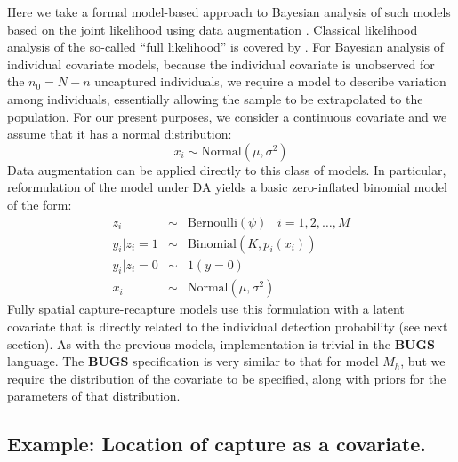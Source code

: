 Here we take a formal model-based approach to Bayesian analysis of
such models based on the joint likelihood using data augmentation
\citep{royle:2009}. Classical likelihood analysis of the so-called
``full likelihood'' is covered by \citet{borchers_etal:2002}.  For
Bayesian analysis of individual covariate models, because the
individual covariate is unobserved for the $n_{0} = N-n$ uncaptured
individuals, we require a model to describe variation among
individuals, essentially allowing the sample to be extrapolated to the
population.  For our present purposes, we consider a continuous
covariate and we assume that it has a normal distribution:
\[
x_{i} \sim \mbox{Normal}(\mu,\sigma^{2})
\]
Data augmentation can be applied directly to this class of models. In
particular, reformulation of the model under DA yields a basic
zero-inflated binomial model of the form:
\begin{eqnarray*}
z_{i} &\sim& \mbox{Bernoulli}(\psi) \; \; \; i=1,2,\ldots,M\\
y_{i}|{z_{i}\! =\! 1} &\sim& \mbox{Binomial}(K,p_{i}(x_{i})) \\
y_{i} |{ z_{i}\! =\! 0} &\sim& 1(y=0)  \\
x_{i} & \sim & \mbox{Normal}(\mu,\sigma^{2})
\end{eqnarray*}
Fully spatial capture-recapture models use this formulation with a
latent covariate that is directly related to the individual detection
probability (see next section). As with the previous models,
implementation is trivial in the {\bf BUGS} language. The {\bf BUGS}
specification is very similar to that for model $M_h$, but we require
the distribution of the covariate to be specified, along with priors
for the parameters of that distribution.


\subsection{Example: Location of capture as a covariate.}


